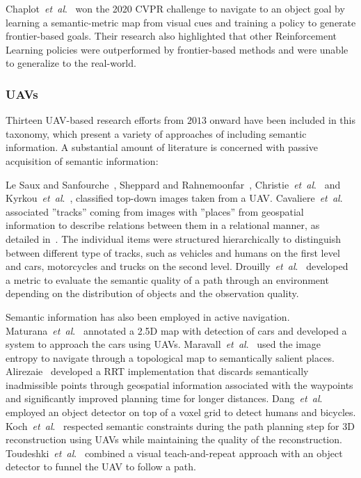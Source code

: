 \documentclass[twocolumn,letterpaper]{IEEEAerospaceCLS}  %
\newcommand{\abbreviation}[1]{\emph{#1}.}
\newcommand{\etal}{\abbreviation{et~al}}
\begin{document}
Chaplot~\etal~\cite{chaplot_object_2020} won the 2020 CVPR challenge to navigate to an object goal by learning a semantic-metric map from visual cues and training a policy to generate frontier-based goals. Their research also highlighted that other Reinforcement Learning policies were outperformed by frontier-based methods and were unable to generalize to the real-world.

\subsubsection{UAVs} \label{sssec:LitResUAV}
Thirteen UAV-based research efforts from $2013$ onward have been included in this taxonomy, which present a variety of approaches of including semantic information. A substantial amount of literature is concerned with passive acquisition of semantic information:

Le Saux and Sanfourche~\cite{saux_rapid_2013}, Sheppard and Rahnemoonfar~\cite{sheppard_real-time_2017}, Christie~\etal~\cite{christie_semantics_2016} and Kyrkou~\etal~\cite{kyrkou_dronet:_2018}, classified top-down images taken from a UAV. Cavaliere~\etal~\cite{cavaliere_towards_2016,cavaliere_towards_2018} associated ''tracks'' coming from images with ''places'' from geospatial information to describe relations between them in a relational manner, as detailed in~\cite{landsiedel_review_2017}. The individual items were structured hierarchically to distinguish between different type of tracks, such as vehicles and humans on the first level and cars, motorcycles and trucks on the second level. Drouilly~\etal~\cite{drouilly_semantic_2015} developed a metric to evaluate the semantic quality of a path through an environment depending on the distribution of objects and the observation quality.

Semantic information has also been employed in active navigation. Maturana~\etal~\cite{maturana_looking_2017} annotated a 2.5D map with detection of cars and developed a system to approach the cars using UAVs. Maravall~\etal~\cite{maravall_navigation_2017} used the image entropy to navigate through a topological map to semantically salient places. Alirezaie~\cite{alirezaie_exploiting_2017} developed a RRT implementation that discards semantically inadmissible points through geospatial information associated with the waypoints and significantly improved planning time for longer distances. Dang~\etal~\cite{dang_autonomous_2018} employed an object detector on top of a voxel grid to detect humans and bicycles. Koch~\etal~\cite{koch_automatic_2019} respected semantic constraints during the path planning step for 3D reconstruction using UAVs while maintaining the quality of the reconstruction.
Toudeshki~\etal~\cite{toudeshki_robust_2018} combined a visual teach-and-repeat approach with an object detector to funnel the UAV to follow a path.
\end{document}
